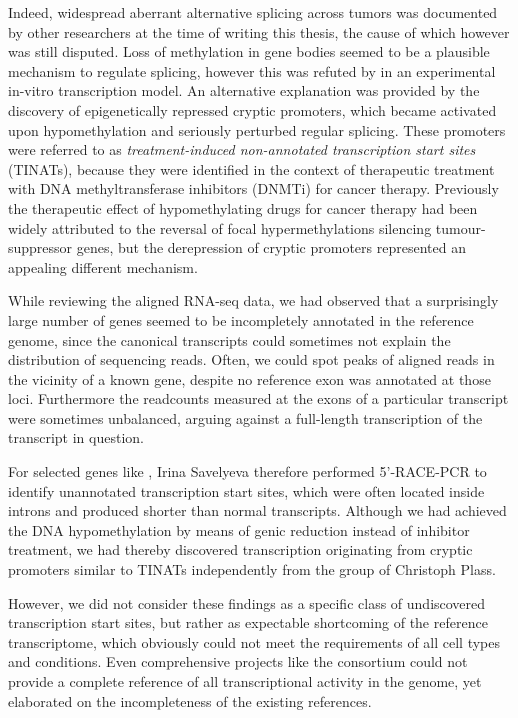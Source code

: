 Indeed, widespread aberrant alternative splicing across tumors was documented by other researchers\cite{Kahles2018} at the time of writing this thesis, the cause of which however was still disputed. Loss of methylation in gene bodies seemed to be a plausible mechanism to regulate splicing\cite{Mendizabal2017}, however this was refuted by in an experimental in-vitro transcription model\cite{Nanan2017}. An alternative explanation was provided by the discovery of epigenetically repressed cryptic promoters, which became activated upon hypomethylation and seriously perturbed regular splicing\cite{Brocks2017}. These promoters were referred to as \emph{treatment-induced non-annotated transcription start sites} (TINATs), because they were identified in the context of therapeutic treatment with DNA methyltransferase inhibitors (DNMTi) for cancer therapy. Previously the therapeutic effect of hypomethylating drugs for cancer therapy had been widely attributed to the reversal of focal hypermethylations silencing tumour-suppressor genes\cite{Cai2017}, but the derepression of cryptic promoters represented an appealing different mechanism.

While reviewing the aligned RNA-seq data, we had observed that a surprisingly large number of genes seemed to be incompletely annotated in the reference genome, since the canonical transcripts could sometimes not explain the distribution of sequencing reads. Often, we could spot peaks of aligned reads in the vicinity of a known gene, despite no reference exon was annotated at those loci. Furthermore the readcounts measured at the exons of a particular transcript were sometimes unbalanced, arguing against a full-length transcription of the transcript in question. 

For selected genes like , Irina Savelyeva therefore performed 5'-RACE-PCR to identify unannotated transcription start sites, which were often located inside introns and produced shorter than normal transcripts. Although we had achieved the DNA hypomethylation by means of genic  reduction instead of inhibitor treatment, we had thereby discovered transcription originating from cryptic promoters similar to TINATs independently from the group of Christoph Plass\cite{Brocks2017}. 

However, we did not consider these findings as a specific class of undiscovered transcription start sites, but rather as expectable shortcoming of the reference transcriptome, which obviously could not meet the requirements of all cell types and conditions. Even comprehensive projects like the  consortium could not provide a complete reference of all transcriptional activity in the genome, yet elaborated on the incompleteness of the existing references\cite{Carninci2005,Faulkner2008}.

